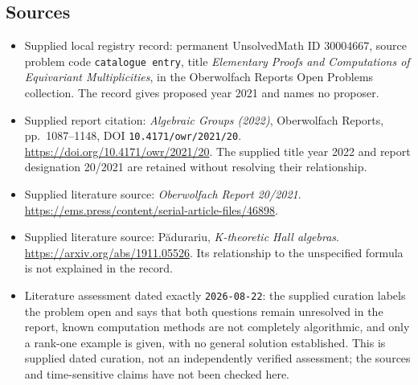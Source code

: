 \documentclass[11pt]{article}
\begin{document}
\subsection{Sources}
\begin{itemize}
\item Supplied local registry record: permanent UnsolvedMath ID \(30004667\), source problem code \texttt{catalogue entry}, title \emph{Elementary Proofs and Computations of Equivariant Multiplicities}, in the Oberwolfach Reports Open Problems collection. The record gives proposed year 2021 and names no proposer.
\item Supplied report citation: \emph{Algebraic Groups (2022)}, Oberwolfach Reports, pp.~1087--1148, DOI \texttt{10.4171/owr/2021/20}. \url{https://doi.org/10.4171/owr/2021/20}. The supplied title year 2022 and report designation 20/2021 are retained without resolving their relationship.
\item Supplied literature source: \emph{Oberwolfach Report 20/2021}. \url{https://ems.press/content/serial-article-files/46898}.
\item Supplied literature source: P\u{a}durariu, \emph{K-theoretic Hall algebras}. \url{https://arxiv.org/abs/1911.05526}. Its relationship to the unspecified formula is not explained in the record.
\item Literature assessment dated exactly \texttt{2026-08-22}: the supplied curation labels the problem open and says that both questions remain unresolved in the report, known computation methods are not completely algorithmic, and only a rank-one example is given, with no general solution established. This is supplied dated curation, not an independently verified assessment; the sources and time-sensitive claims have not been checked here.
\end{itemize}
\end{document}
